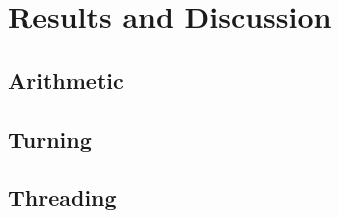 \chapter{Results and Discussion}
\label{resultanddiscussion}
\section{Arithmetic}
\section{Turning}
\section{Threading}

